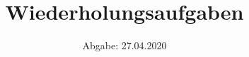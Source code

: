 

\subject{Anfängerpraktikum SoSe 2020}
\title{Wiederholungsaufgaben}
\date{%
  Abgabe: 27.04.2020
}



\maketitle
\thispagestyle{empty}
\tableofcontents
\newpage





\printbibliography{}


